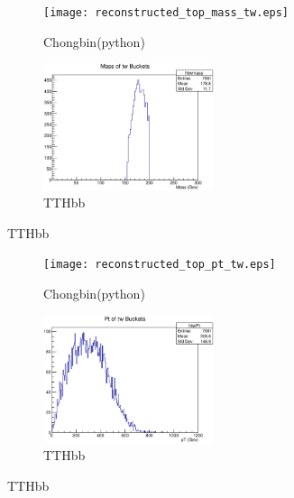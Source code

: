 \documentclass{beamer}
\begin{document}




\begin{frame}
  \begin{figure}[!h]
  \captionsetup[subfigure]{labelformat=empty}
  \begin{subfigure}{.5\textwidth}
  \centering
  \texttt{[image: reconstructed\_top\_mass\_tw.eps]}
  \caption{Chongbin(python)}
  \end{subfigure} \hfill
  \begin{subfigure}{.5\textwidth}
  \centering
  \includegraphics[width=5cm]{htwmass_alljetregion.eps}
  \caption{TTHbb}
  \end{subfigure}
  \end{figure}
\end{frame}

\begin{frame}
  \begin{figure}[!h]
  \captionsetup[subfigure]{labelformat=empty}
  \begin{subfigure}{.5\textwidth}
  \centering
  \texttt{[image: reconstructed\_top\_pt\_tw.eps]}
  \caption{Chongbin(python)}
  \end{subfigure} \hfill
  \begin{subfigure}{.5\textwidth}
  \centering
  \includegraphics[width=5cm]{htwPt_alljetregion.eps}
  \caption{TTHbb}
  \end{subfigure}
  \end{figure}
\end{frame}
\end{document}
